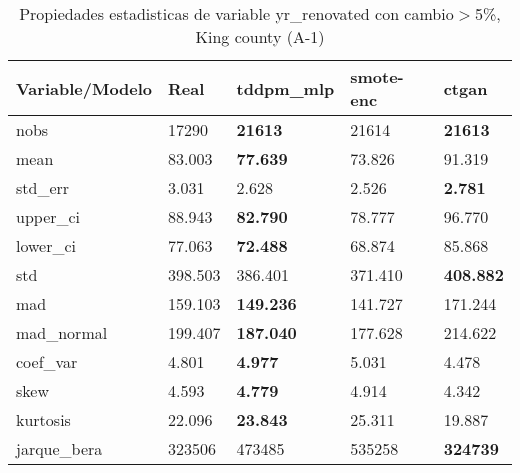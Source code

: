 \begin{table}[H]
\centering
\fontsize{8}{14}\selectfont
\caption{Propiedades estadisticas de variable yr\_renovated con cambio\ensuremath{>}5\%, King county (A-1)}
\label{table-stats-king county-a-1-yr_renovated-short}
\begin{tabular}{|l|m{10em}|m{10em}|m{10em}|m{10em}|}
\hline
 \rowcolor[gray]{0.8}
Variable/Modelo & Real & tddpm\_mlp & smote-enc & ctgan \\
\hline nobs & 17290 & \bfseries 21613 & \cellcolor[rgb]{0.9, 0.54, 0.52} 21614 & \bfseries 21613 \\
\hline mean & 83.003 & \bfseries 77.639 & \cellcolor[rgb]{0.9, 0.54, 0.52} 73.826 & 91.319 \\
\hline std\_err & 3.031 & 2.628 & \cellcolor[rgb]{0.9, 0.54, 0.52} 2.526 & \bfseries 2.781 \\
\hline upper\_ci & 88.943 & \bfseries 82.790 & \cellcolor[rgb]{0.9, 0.54, 0.52} 78.777 & 96.770 \\
\hline lower\_ci & 77.063 & \bfseries 72.488 & 68.874 & \cellcolor[rgb]{0.9, 0.54, 0.52} 85.868 \\
\hline std & 398.503 & 386.401 & \cellcolor[rgb]{0.9, 0.54, 0.52} 371.410 & \bfseries 408.882 \\
\hline mad & 159.103 & \bfseries 149.236 & \cellcolor[rgb]{0.9, 0.54, 0.52} 141.727 & 171.244 \\
\hline mad\_normal & 199.407 & \bfseries 187.040 & \cellcolor[rgb]{0.9, 0.54, 0.52} 177.628 & 214.622 \\
\hline coef\_var & 4.801 & \bfseries 4.977 & 5.031 & \cellcolor[rgb]{0.9, 0.54, 0.52} 4.478 \\
\hline skew & 4.593 & \bfseries 4.779 & \cellcolor[rgb]{0.9, 0.54, 0.52} 4.914 & 4.342 \\
\hline kurtosis & 22.096 & \bfseries 23.843 & \cellcolor[rgb]{0.9, 0.54, 0.52} 25.311 & 19.887 \\
\hline jarque\_bera & 323506 & 473485 & \cellcolor[rgb]{0.9, 0.54, 0.52} 535258 & \bfseries 324739 \\
\hline
\end{tabular}
\end{table}
